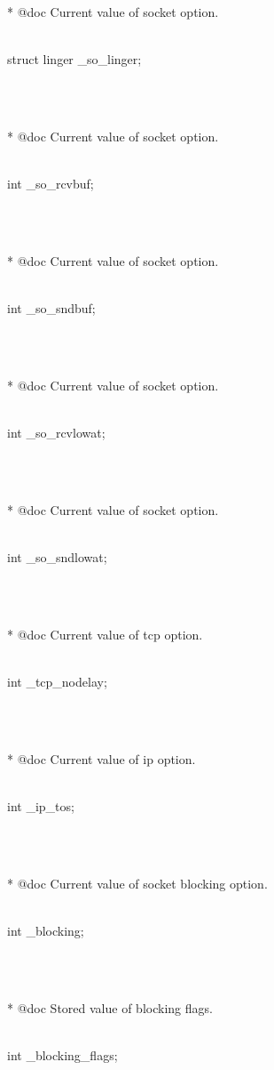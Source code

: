 \documentclass{article}
\begin{document}
{\strut\\\strut\\* @doc Current value of socket option.  \strut\goodbreak
{}\strut\nopagebreak\\
         struct linger _so_linger;
\strut\\\strut\\* @doc Current value of socket option.  \strut\goodbreak
{}\strut\nopagebreak\\
         int _so_rcvbuf;
\strut\\\strut\\* @doc Current value of socket option.  \strut\goodbreak
{}\strut\nopagebreak\\
         int _so_sndbuf;
\strut\\\strut\\* @doc Current value of socket option.  \strut\goodbreak
{}\strut\nopagebreak\\
         int _so_rcvlowat;
\strut\\\strut\\* @doc Current value of socket option.  \strut\goodbreak
{}\strut\nopagebreak\\
         int _so_sndlowat;
\strut\\\strut\\* @doc Current value of tcp option.  \strut\goodbreak
{}\strut\nopagebreak\\
         int _tcp_nodelay;
\strut\\\strut\\* @doc Current value of ip option.  \strut\goodbreak
{}\strut\nopagebreak\\
         int _ip_tos;
\strut\\\strut\\* @doc Current value of socket blocking option.  \strut\goodbreak
{}\strut\nopagebreak\\
         int _blocking;
\strut\\\strut\\* @doc Stored value of blocking flags. \strut\goodbreak
{}\strut\nopagebreak\\
         int _blocking_flags;
\\
}
\end{document}
